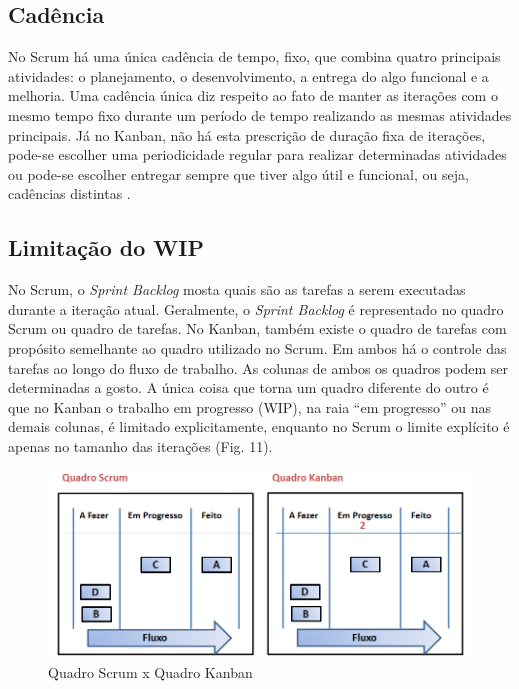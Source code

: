 \subsection[Cadência]{Cadência}

No Scrum há uma única cadência de tempo, fixo, que combina quatro principais atividades: o planejamento, o desenvolvimento, a entrega do algo funcional e a melhoria. Uma cadência única diz respeito ao fato de manter as iterações com o mesmo tempo fixo durante um período de tempo realizando as mesmas atividades principais. Já no Kanban, não há esta prescrição de duração fixa de iterações, pode-se escolher uma periodicidade regular para realizar determinadas atividades ou pode-se escolher entregar sempre que tiver algo útil e funcional, ou seja, cadências distintas  \cite{kniberg2009}. 

\subsection[Limitação do WIP]{Limitação do WIP}

No Scrum, o \textit{Sprint Backlog} mosta quais são as tarefas a serem executadas durante a iteração atual. Geralmente, o \textit{Sprint Backlog} é representado no quadro Scrum ou quadro de tarefas. No Kanban, também existe o quadro de tarefas com propósito semelhante ao quadro utilizado no Scrum. Em ambos há o controle das tarefas ao longo do fluxo de trabalho. As colunas de ambos os quadros podem ser determinadas a gosto. A única coisa que torna um quadro diferente do outro é que no Kanban o trabalho em progresso (WIP), na raia “em progresso” ou nas demais colunas, é limitado explicitamente, enquanto no Scrum o limite explícito é apenas no tamanho das iterações (Fig. 11). 

\begin{figure}[H]
		\centering
		\label{fig03}
			\includegraphics[scale=0.7]{figuras/quadros.png}
		\caption{Quadro Scrum x Quadro Kanban  \cite{kniberg2009}}
\end{figure}


